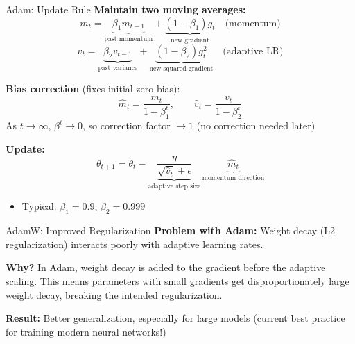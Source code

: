 \begin{frame}[allowframebreaks]{Adam: Update Rule}
\textbf{Maintain two moving averages:}
\[
m_t = \underbrace{\beta_1 m_{t-1}}_{\text{past momentum}} + \underbrace{(1 - \beta_1) g_t}_{\text{new gradient}} \quad \text{(momentum)}
\]
\[
v_t = \underbrace{\beta_2 v_{t-1}}_{\text{past variance}} + \underbrace{(1 - \beta_2) g_t^2}_{\text{new squared gradient}} \quad \text{(adaptive LR)}
\]

\textbf{Bias correction} (fixes initial zero bias):
\[
\hat m_t = \frac{m_t}{1 - \beta_1^t}, \qquad \hat v_t = \frac{v_t}{1 - \beta_2^t}
\]
{\footnotesize As $t \to \infty$, $\beta^t \to 0$, so correction factor $\to 1$ (no correction needed later)}

\framebreak

\textbf{Update:}
\[
\theta_{t+1} = \theta_t - \underbrace{\frac{\eta}{\sqrt{\hat v_t} + \epsilon}}_{\text{adaptive step size}} \, \underbrace{\hat m_t}_{\text{momentum direction}}
\]
\begin{itemize}
\item Typical: $\beta_1 = 0.9$, $\beta_2 = 0.999$
\end{itemize}
\end{frame}
\begin{frame}{AdamW: Improved Regularization}
\textbf{Problem with Adam:} Weight decay (L2 regularization) interacts poorly with adaptive learning rates.

\textbf{Why?} In Adam, weight decay is added to the gradient before the adaptive scaling. This means parameters with small gradients get disproportionately large weight decay, breaking the intended regularization.

\vspace{0.5em}
\centering
{}

\vspace{0.2em}
\textbf{Result:} Better generalization, especially for large models (current best practice for training modern neural networks!)
\end{frame}


